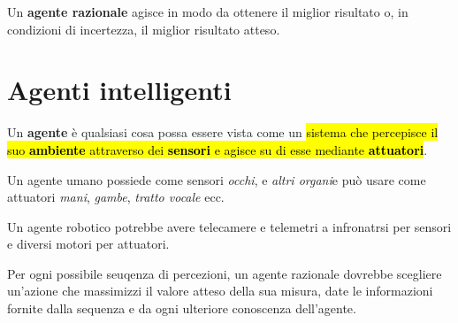 \documentclass[a4paper, 12pt]{book}
\begin{document}
    Un \textbf{agente razionale} agisce in modo da ottenere il miglior risultato o, in condizioni di incertezza, il miglior risultato atteso.


    \chapter*{Agenti intelligenti}
    Un \textbf{agente} è qualsiasi cosa possa essere vista come un \hl{sistema che percepisce il suo \textbf{ambiente} attraverso dei \textbf{sensori} e agisce su di esse mediante \textbf{attuatori}}.

    Un agente umano possiede come sensori \textit{occhi}, e \textit{altri organi}e può usare come attuatori \textit{mani}, \textit{gambe}, \textit{tratto vocale} ecc.

    Un agente robotico potrebbe avere telecamere e telemetri a infronatrsi per sensori e diversi motori per attuatori.


    \begin{tcolorbox}[
      colback=cyan!5!white,
      colframe=blue!50!black,
      title=\textbf{Definizione formale di agente razionale},
      coltitle=white,
      fonttitle=\bfseries,
      arc=3mm,
      boxrule=0.5pt,
      enhanced,
      breakable
    ]
      Per ogni possibile seuqenza di percezioni, un agente razionale dovrebbe scegliere un'azione che massimizzi il valore atteso della sua misura, date le informazioni fornite dalla sequenza e da ogni ulteriore conoscenza dell'agente.
    \end{tcolorbox}
\end{document}
